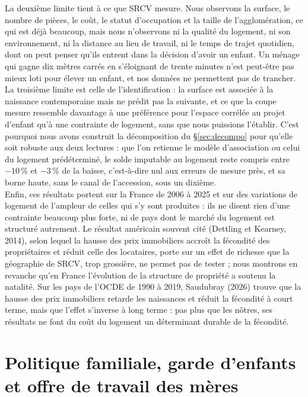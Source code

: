 \documentclass[12pt,a4paper]{article}
\begin{document}
\noindent La deuxième limite tient à ce que SRCV mesure. Nous observons la surface, le nombre de pièces, le coût, le statut d'occupation et la taille de l'agglomération, ce qui est déjà beaucoup, mais nous n'observons ni la qualité du logement, ni son environnement, ni la distance au lieu de travail, ni le temps de trajet quotidien, dont on peut penser qu'ils entrent dans la décision d'avoir un enfant. Un ménage qui gagne dix mètres carrés en s'éloignant de trente minutes n'est peut-être pas mieux loti pour élever un enfant, et nos données ne permettent pas de trancher. \\

\noindent La troisième limite est celle de l'identification : la surface est associée à la naissance contemporaine mais ne prédit pas la suivante, et ce que la coupe mesure ressemble davantage à une préférence pour l'espace corrélée au projet d'enfant qu'à une contrainte de logement, sans que nous puissions l'établir. C'est pourquoi nous avons construit la décomposition du §\ref{sec:decompo} pour qu'elle soit robuste aux deux lectures : que l'on retienne le modèle d'association ou celui du logement prédéterminé, le solde imputable au logement reste compris entre $-10$\,\% et $-3$\,\% de la baisse, c'est-à-dire nul aux erreurs de mesure près, et sa borne haute, sans le canal de l'accession, sous un dixième. \\

\noindent Enfin, ces résultats portent sur la France de 2006 à 2025 et sur des variations de logement de l'ampleur de celles qui s'y sont produites : ils ne disent rien d'une contrainte beaucoup plus forte, ni de pays dont le marché du logement est structuré autrement. Le résultat américain souvent cité (Dettling et Kearney, 2014), selon lequel la hausse des prix immobiliers accroît la fécondité des propriétaires et réduit celle des locataires, porte sur un effet de richesse que la géographie de SRCV, trop grossière, ne permet pas de tester ; nous montrons en revanche qu'en France l'évolution de la structure de propriété a soutenu la natalité. Sur les pays de l'OCDE de 1990 à 2019, Saudubray (2026) trouve que la hausse des prix immobiliers retarde les naissances et réduit la fécondité à court terme, mais que l'effet s'inverse à long terme : pas plus que les nôtres, ses résultats ne font du coût du logement un déterminant durable de la fécondité.

\newpage

\section{Politique familiale, garde d'enfants et offre de travail des mères}
\end{document}

